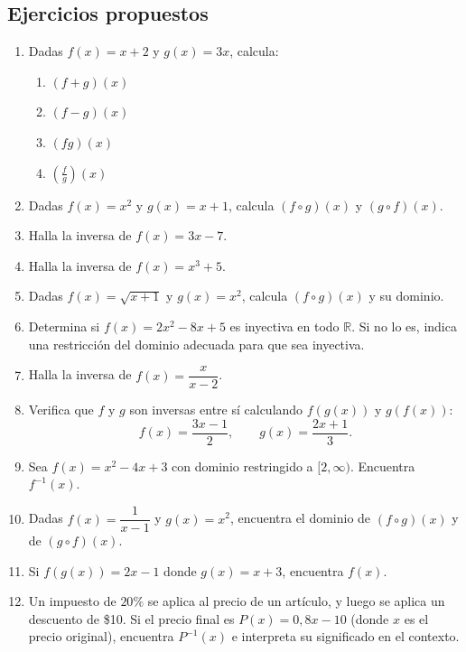 \documentclass[12pt, letterpaper]{article}
\begin{document}
\subsection{Ejercicios propuestos}

\begin{enumerate}[resume=ejercicios, leftmargin=*]
  \item \facil{} Dadas $f(x) = x + 2$ y $g(x) = 3x$, calcula:
        \begin{enumerate}[label=\alph*)]
          \item $(f + g)(x)$
          \item $(f - g)(x)$
          \item $(fg)(x)$
          \item $\left(\frac{f}{g}\right)(x)$
        \end{enumerate}

  \item \facil{} Dadas $f(x) = x^2$ y $g(x) = x + 1$, calcula $(f \circ g)(x)$ y $(g \circ f)(x)$.

  \item \facil{} Halla la inversa de $f(x) = 3x - 7$.

  \item \facil{} Halla la inversa de $f(x) = x^3 + 5$.

  \item \medio{} Dadas $f(x) = \sqrt{x + 1}$ y $g(x) = x^2$, calcula $(f \circ g)(x)$ y su dominio.

  \item \medio{} Determina si $f(x) = 2x^2 - 8x + 5$ es inyectiva en todo $\mathbb{R}$. Si no lo es, indica una restricción del dominio adecuada para que sea inyectiva.

  \item \medio{} Halla la inversa de $f(x) = \dfrac{x}{x - 2}$.

  \item \medio{} Verifica que $f$ y $g$ son inversas entre sí calculando $f(g(x))$ y $g(f(x))$:
        $$f(x) = \frac{3x - 1}{2}, \qquad g(x) = \frac{2x + 1}{3}.$$

  \item \dificil{} Sea $f(x) = x^2 - 4x + 3$ con dominio restringido a $[2, \infty)$. Encuentra $f^{-1}(x)$.

  \item \dificil{} Dadas $f(x) = \dfrac{1}{x - 1}$ y $g(x) = x^2$, encuentra el dominio de $(f \circ g)(x)$ y de $(g \circ f)(x)$.

  \item \dificil{} Si $f(g(x)) = 2x - 1$ donde $g(x) = x + 3$, encuentra $f(x)$.

  \item \dificil{} Un impuesto de $20\%$ se aplica al precio de un artículo, y luego se aplica un descuento de \$10. Si el precio final es $P(x) = 0{,}8x - 10$ (donde $x$ es el precio original), encuentra $P^{-1}(x)$ e interpreta su significado en el contexto.
\end{enumerate}
\end{document}
